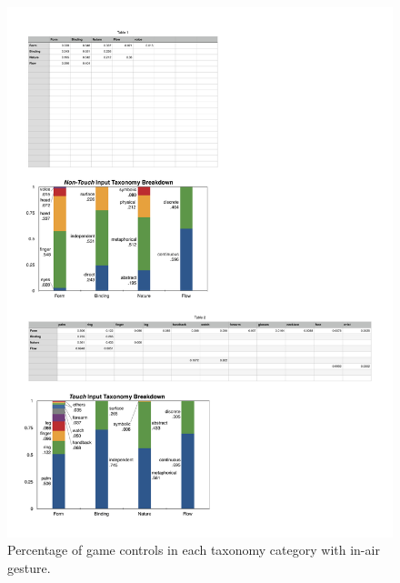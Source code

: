 \documentclass{sigchi}
\begin{document}
 \begin{figure}[!h]
  \centering
  \includegraphics[width=1\columnwidth]{InAirTaxonomy}
  \caption{Percentage of game controls in each taxonomy category with in-air gesture.}
  \label{fig:InAirTaxonomy}
  \end{figure} 
\end{document}
